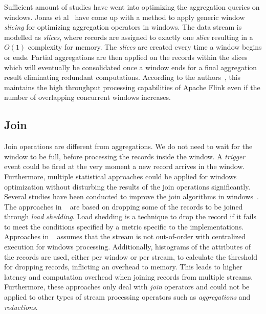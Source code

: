 Sufficient amount of studies have went into optimizing the aggregation queries 
on windows. Jonas et al~\cite{scotty, jonas_scotty} have come up with a method to 
apply generic window \emph{slicing} for optimizing aggregation operators in windows. 
The data stream is modelled as \emph{slices}, where 
records are assigned to exactly one \emph{slice} resulting in a 
$O(1)$ complexity for memory. The \emph{slices} are created every time a 
window begins or ends. Partial aggregations are then applied on the 
records within the slices which will eventually be consolidated once 
a window ends for a final aggregation result eliminating redundant 
computations. According to the authors~\cite{jonas_scotty}, this maintains 
the high throughput processing capabilities of Apache Flink even if the 
number of overlapping concurrent windows increases. 


\subsection{Join}%
\label{sub:Join}

Join operations are different from aggregations. We do not need 
to wait for the window to be full, before processing the records inside the 
window. A \emph{trigger} event could be fired at the very moment a new 
record arrives in the window. Furthermore, multiple statistical approaches 
could be applied for windows optimization without disturbing the results 
of the join operations significantly. Several studies have been conducted to 
improve the join algorithms in windows~\cite{vctw_join, join_tracking, grubjoin, approximate_window_sem, approx_window}. 
The approaches in ~\cite{grubjoin, approximate_window_sem, approx_window} are based 
on dropping some of the records to be joined through \emph{load shedding}. 
Load shedding is a technique to drop the record if 
it fails to meet the conditions specified 
by a metric specific to the implementations. Approaches in ~\cite{grubjoin, approximate_window_sem, approx_window}
assumes that the stream is not out-of-order with centralized execution for 
windows processing. Additionally, histograms of the attributes of the records are used, 
either per window or per stream, 
to calculate the threshold for dropping records, inflicting an overhead to memory. 
This leads to higher latency and computation overhead 
when joining records from multiple streams. Furthermore, 
these approaches only deal with \emph{join} operators and could not be applied to other 
types of stream processing operators such as \emph{aggregations} and \emph{reductions}.

